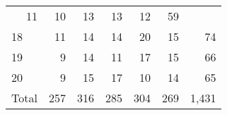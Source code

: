 \documentclass{article}
\begin{document}
\begin{table}[!h]
\begin{tabular}{lllllll}
  \multicolumn{1}{|r}{11} &
  \multicolumn{1}{r}{10} &
  \multicolumn{1}{r}{13} &
  \multicolumn{1}{r}{13} &
  \multicolumn{1}{r}{12} &
  \multicolumn{1}{r}{59} \\
\multicolumn{1}{l}{\hspace{1em}18} &
  \multicolumn{1}{|r}{11} &
  \multicolumn{1}{r}{14} &
  \multicolumn{1}{r}{14} &
  \multicolumn{1}{r}{20} &
  \multicolumn{1}{r}{15} &
  \multicolumn{1}{r}{74} \\
\multicolumn{1}{l}{\hspace{1em}19} &
  \multicolumn{1}{|r}{9} &
  \multicolumn{1}{r}{14} &
  \multicolumn{1}{r}{11} &
  \multicolumn{1}{r}{17} &
  \multicolumn{1}{r}{15} &
  \multicolumn{1}{r}{66} \\
\multicolumn{1}{l}{\hspace{1em}20} &
  \multicolumn{1}{|r}{9} &
  \multicolumn{1}{r}{15} &
  \multicolumn{1}{r}{17} &
  \multicolumn{1}{r}{10} &
  \multicolumn{1}{r}{14} &
  \multicolumn{1}{r}{65} \\
\multicolumn{1}{l}{\hspace{1em}Total} &
  \multicolumn{1}{|r}{257} &
  \multicolumn{1}{r}{316} &
  \multicolumn{1}{r}{285} &
  \multicolumn{1}{r}{304} &
  \multicolumn{1}{r}{269} &
  \multicolumn{1}{r}{1,431} \\
\cline{1-7}
\end{tabular}
\end{table}
\end{document}
